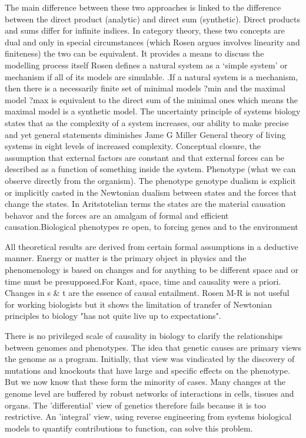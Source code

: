 \documentclass[onecollarge,runningheads]{svjour2}
\begin{document}
The main difference between these two approaches is linked to the difference between the direct product (analytic) and direct sum (synthetic). Direct products and sums differ for infinite indices. In category theory, these two concepts are dual and only in special circumstances (which Rosen argues involves linearity and finiteness) the two can be equivalent.
It provides a means to discuss the modelling process itself %
Rosen defines a natural system as
a ‘simple system’ or mechanism if all of its models are simulable. .If a natural system is a mechanism, then there is a necessarily finite set of minimal models ?min and the maximal model ?max is equivalent to the direct sum of the minimal ones which means the maximal model is a synthetic model. The uncertainty principle of systems biology states that as the complexity of a system increases, our ability to make precise and yet general statements diminishes
Jame G Miller General theory of living systems in eight levels of increased complexity.
Conceptual closure, the assumption that external factors are constant and that external forces can be described as a function of something inside the system. 
Phenotype (what we can observe directly from the organism). The phenotype genotype dualism is explicit or implicitly casted in the Newtonian dualism between states and the forces that change the states. In Aritstotelian terms the states are the material causation behavor and the forces are an amalgam of formal and efficient causation.Biological phenotypes re open, to forcing genes and to the environment

All theoretical results are derived from certain formal assumptions in a deductive manner. Energy or matter is the primary object in physics and the phenomenology is based on changes and for anything to be different space and or time must be presupposed.For Kant, space, time and causality were a priori. Changes in s & t are the essence of causal entailment. Rosen M-R is not useful for working biologists but it shows the limitation of transfer of Newtonian principles to biology "has not quite live up to expectations".

There is no privileged scale of causality in biology to clarify the relationships between genomes and phenotypes.  The idea that genetic causes are primary views the genome as a program. Initially, that view was vindicated by the discovery of mutations and knockouts that have large and specific effects on the phenotype. But we now know that these form the minority of cases. Many changes at the genome level are buffered by robust networks of interactions in cells, tissues and organs.  The 'differential' view of genetics therefore fails because it is too restrictive. An 'integral' view, using reverse engineering from systems biological models to quantify contributions to function, can solve this problem. %
\end{document}
